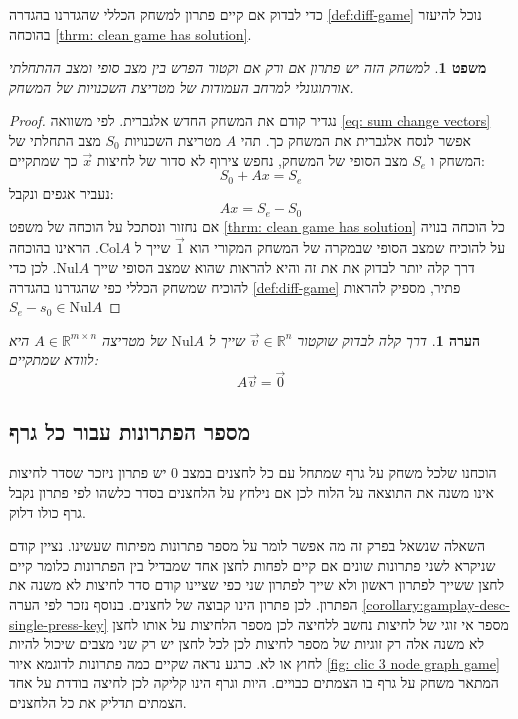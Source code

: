 \documentclass[12pt,leqno]{article}
\theoremstyle{theoremdd}
\newtheorem{theorem}{משפט}[section]
\newtheorem{comm}{הערה}[section]
\newcommand{\Col}{\mathrm{Col}}
\newcommand{\Nul}{\mathrm{Nul}}
\begin{document}
כדי לבדוק אם קיים פתרון למשחק הכללי שהגדרנו 
בהגדרה 
\ref{def:diff-game}
נוכל להיעזר בהוכחה
\ref{thrm: clean game has solution}.
\begin{theorem}
    למשחק הזה יש פתרון אם ורק אם וקטור הפרש בין מצב סופי ומצב ההתחלתי אורתוגונלי למרחב 
    העמודות של מטריצת השכנויות של המשחק.
\end{theorem}
\begin{proof}
    נגדיר קודם את המשחק החדש אלגברית.
    לפי משוואה 
    \ref{eq: sum change vectors}
    אפשר לנסח אלגברית את המשחק כך.
    תהי 
    $A$
    מטריצת השכנויות 
    $S_0$
    מצב התחלתי של המשחק 
    ו
    $S_e$
    מצב הסופי של המשחק,
    נחפש צירוף 
    לא סדור של לחיצות 
    $\vec x$
    כך שמתקיים:
    \[
        S_0 + Ax = S_e
    \]
    נעביר אגפים ונקבל:
    \[
         Ax = S_e - S_0
    \]
    אם נחזור ונסתכל על הוכחה
    של משפט 
    \ref{thrm: clean game has solution}
    כל הוכחה בנויה על להוכיח שמצב הסופי 
    שבמקרה של המשחק המקורי הוא 
    $\vec 1$
    שייך ל
    $\Col A$.
    הראינו בהוכחה דרך 
    קלה יותר לבדוק את את זה והיא
    להראות שהוא שמצב
    הסופי 
    שייך 
    $\Nul A$.
    לכן כדי להוכיח שמשחק הכללי כפי שהגדרנו 
    בהגדרה 
    \ref{def:diff-game}
    פתיר, 
    מספיק להראות 
    $S_e - s_0 \in \Nul A$
\end{proof}
\begin{comm}
    דרך קלה לבדוק שוקטור 
    $\vec v \in \mathbb{R}^{n}$
    שייך 
    ל
    $\Nul A$
    של מטריצה 
    $A \in \mathbb{R}^{m \times n}$
    היא לוודא שמתקיים:
    \[ A \vec v = \vec 0\]
\end{comm}
\subsection{מספר הפתרונות עבור כל גרף}
הוכחנו שלכל משחק על גרף שמתחל עם כל לחצנים במצב 
$0$
יש פתרון ניזכר שסדר לחיצות
אינו משנה את התוצאה על הלוח לכן אם נילחץ על הלחצנים בסדר כלשהו 
לפי פתרון נקבל גרף כולו דלוק.

השאלה  שנשאל בפרק זה מה אפשר לומר על מספר פתרונות מפיתוח שעשינו.
נציין קודם שניקרא לשני פתרונות שונים אם קיים לפחות לחצן אחד שמבדיל בין הפתרונות 
כלומר קיים לחצן ששייך לפתרון ראשון ולא שייך לפתרון שני כפי שציינו קודם סדר
לחיצות לא משנה את הפתרון.
לכן פתרון הינו קבוצה של לחצנים.
בנוסף נזכר לפי הערה
\ref{corollary:gamplay-desc-single-press-key}
מספר אי זוגי של לחיצות נחשב ללחיצה לכן מספר הלחיצות על אותו לחצן לא משנה 
אלה רק זוגיות של מספר לחיצות 
לכן לכל לחצן יש רק שני מצבים שיכול להיות 
לחוץ 
או לא.
כרגע נראה שקיים כמה פתרונות לדוגמא 
איור
\ref{fig: clic 3 node graph game}
המתאר משחק על גרף בו הצמתים כבויים.
היות וגרף הינו קליקה לכן לחיצה בודדת על אחד הצמתים תדליק את כל הלחצנים.
\end{document}
